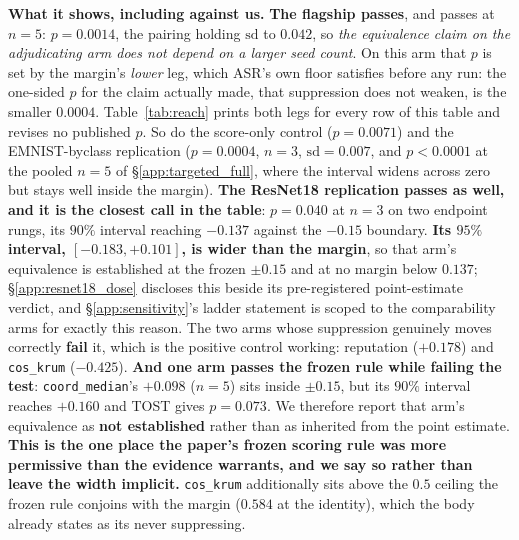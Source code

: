 \documentclass{article}
\begin{document}
\textbf{What it shows, including against us.} \textbf{The flagship passes}, and passes at $n{=}5$:
$p{=}0.0014$, the pairing holding $\mathrm{sd}$ to $0.042$, so \emph{the equivalence claim on the
adjudicating arm does not depend on a larger seed count}. On this arm that $p$ is set by the margin's
\emph{lower} leg, which ASR's own floor satisfies before any run: the one-sided $p$ for the claim actually
made, that suppression does not weaken, is the smaller $0.0004$. Table~\ref{tab:reach} prints both legs for
every row of this table and revises no published $p$. So do the score-only control ($p{=}0.0071$)
and the EMNIST-byclass replication ($p{=}0.0004$, $n{=}3$, $\mathrm{sd}{=}0.007$, and $p<0.0001$ at
the pooled $n{=}5$ of §\ref{app:targeted_full}, where the interval widens across zero but stays well
inside the margin). \textbf{The ResNet18 replication passes as well, and it is the closest call in the
table}: $p{=}0.040$ at $n{=}3$ on two endpoint rungs, its $90\%$ interval reaching $-0.137$ against the
$-0.15$ boundary. \textbf{Its $95\%$ interval, $[-0.183,+0.101]$, is wider than the margin}, so that arm's
equivalence is established at the frozen $\pm0.15$ and at no margin below $0.137$; §\ref{app:resnet18_dose}
discloses this beside its pre-registered point-estimate verdict, and §\ref{app:sensitivity}'s ladder
statement is scoped to the comparability arms for exactly this reason. The two arms whose
suppression genuinely moves correctly \textbf{fail} it, which is the positive control working:
reputation ($+0.178$) and \texttt{cos\_krum} ($-0.425$). \textbf{And one arm passes the frozen rule
while failing the test}: \texttt{coord\_median}'s $+0.098$ ($n{=}5$) sits inside $\pm0.15$, but its $90\%$
interval reaches $+0.160$ and TOST gives $p{=}0.073$. We therefore report that arm's equivalence as
\textbf{not established} rather than as inherited from the point estimate. \textbf{This is the one place
the paper's frozen scoring rule was more permissive than the evidence warrants, and we say so rather
than leave the width implicit.} \texttt{cos\_krum} additionally sits above the $0.5$ ceiling the frozen
rule conjoins with the margin ($0.584$ at the identity), which the body already states as its never
suppressing.
\end{document}
